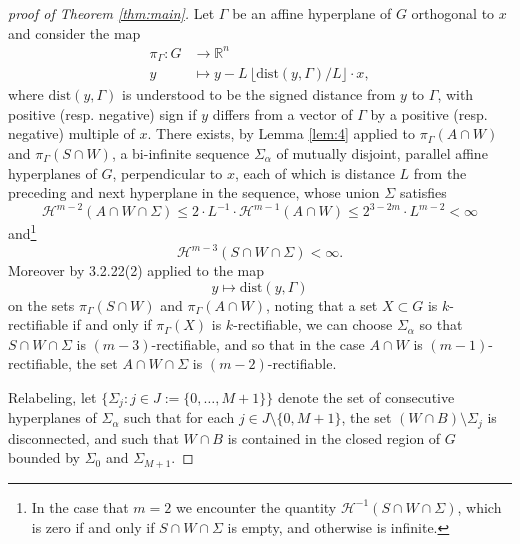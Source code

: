 \documentclass[10pt]{amsart}
\theoremstyle{definition}
\theoremstyle{definition}
\theoremstyle{definition}
\theoremstyle{definition}
\theoremstyle{definition}
\theoremstyle{definition}
\theoremstyle{definition}
\newcommand{\R}{\ensuremath{\mathbb{R}}}
\newcommand{\<}{\langle}
\renewcommand{\>}{\rangle}
\def\i{\infty}
\def\a{\alpha}
\def\G{\Gamma}
\def\H{\mathcal{H}}
\begin{document}
\begin{proof}[proof of Theorem \ref{thm:main}]
	Let \( \G \) be an affine hyperplane of \( G \) orthogonal to \( x \) and consider the map
	\begin{align*}
		\pi_\G:G&\to \R^n\\
		y&\mapsto y-L\,\lfloor \mathrm{dist}(y,\G)/L\rfloor \cdot x,
	\end{align*}
	where \( \mathrm{dist}(y,\G) \) is understood to be the signed distance from \( y \) to \( \G \), with positive (resp. negative) sign if \( y \) differs from a vector of \( \G \) by a positive (resp. negative) multiple of \( x \). There exists, by Lemma \ref{lem:4} applied to \( \pi_\G(A\cap W) \) and \( \pi_\G(S\cap W) \), a bi-infinite sequence \( \Sigma_\a \) of mutually disjoint, parallel affine hyperplanes of \( G \), perpendicular to \( x \), each of which is distance \( L \) from the preceding and next hyperplane in the sequence, whose union \( \Sigma \) satisfies
	\begin{equation}
		\label{inequality:-1}
		\H^{m-2}(A\cap W\cap \Sigma)\leq 2\cdot L^{-1}\cdot\H^{m-1}(A\cap W) \leq 2^{3-2m}\cdot L^{m-2}<\i
	\end{equation}
	and\footnote{In the case that \( m=2 \) we encounter the quantity \( \H^{-1}(S\cap W\cap \Sigma) \), which is zero if and only if \( S\cap W\cap\Sigma \) is empty, and otherwise is infinite.}
	\begin{equation}
		\label{nothing}
		\H^{m-3}(S\cap W\cap \Sigma)<\i.
	\end{equation}
	Moreover by \cite{federer} 3.2.22(2) applied to the map \[ y\mapsto \mathrm{dist}(y,\G) \] on the sets \( \pi_\G(S\cap W) \) and \( \pi_\G(A\cap W) \), noting that a set \( X\subset G \) is \( k \)-rectifiable if and only if \( \pi_\G(X) \) is \( k \)-rectifiable, we can choose \( \Sigma_\a \) so that \( S\cap W\cap \Sigma \) is \( (m-3) \)-rectifiable, and so that in the case \( A\cap W \) is \( (m-1) \)-rectifiable, the set \( A\cap W\cap \Sigma \) is \( (m-2) \)-rectifiable. 
	
	Relabeling, let \( \{ \Sigma_j : j\in J:=\{0,\dots,M+1\} \} \) denote the set of consecutive hyperplanes of \( \Sigma_\a \) such that for each \( j\in J\setminus \{0,M+1\} \), the set \( (W\cap B)\setminus\Sigma_j \) is disconnected, and such that \( W\cap B \) is contained in the closed region of \( G \) bounded by \( \Sigma_0 \) and \( \Sigma_{M+1} \).
	

\end{proof}
\end{document}
